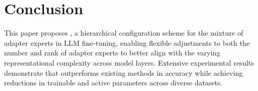 \section{Conclusion}\label{sec:conclusion}
This paper proposes \name, a hierarchical configuration scheme for the mixture of adapter experts in LLM fine-tuning, enabling flexible adjustments to both the number and rank of adapter experts to better align with the varying representational complexity across model layers. Extensive experimental results demonstrate that \name outperforms existing methods in accuracy while achieving reductions in trainable and active parameters across diverse datasets.